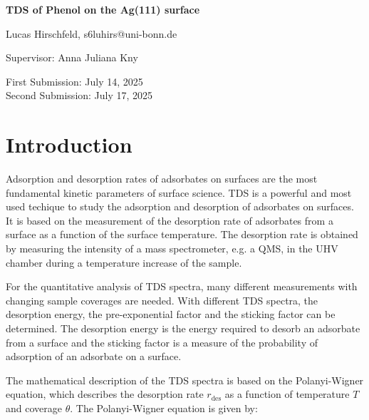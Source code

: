 \documentclass[fontsize=11pt,reqno,a4paper,oneside]{scrartcl}
\makeatletter
\def\Autor{Lucas Hirschfeld, s6luhirs@uni-bonn.de}
\def\Titel{\Acf{TDS} of Phenol on the Ag(111) surface}
\def\Date{First Submission: July 14, 2025 \\Second Submission: July 17, 2025}
\def\PiC{Supervisor: Anna Juliana Kny}
\def\Abstract{}
\makeatother
\begin{document}
\pagestyle{empty}
\begin{titlepage}
    \begin{center}
        \vspace*{\fill}
        {\LARGE\bfseries \Titel}\par\vspace{2cm}
        {\Autor\par\vspace{0.5cm}\PiC\par\vspace{1cm}\par\vspace{0.2cm}\Date\par\vspace{5cm}}
    \end{center}
    {\Abstract\vspace{0.5cm}\par}\vfill
\end{titlepage}

\pagestyle{scrheadings}
\tableofcontents
{}
\clearpage

\section{Introduction}

Adsorption and desorption rates of adsorbates on surfaces are the most fundamental kinetic parameters of surface science. \Acf{TDS} is a powerful and most used techique to study the adsorption and desorption of adsorbates on surfaces.\autocite{Yates2015} It is based on the measurement of the desorption rate of adsorbates from a surface as a function of the surface temperature. The desorption rate is obtained by measuring the intensity of a mass spectrometer, e.g. a \ac{QMS}, in the \ac{UHV} chamber during a temperature increase of the sample.\autocite{Kolasinski2012}

For the quantitative analysis of \ac{TDS} spectra, many different measurements with changing sample coverages are needed. With different \ac{TDS} spectra, the desorption energy, the pre-exponential factor and the sticking factor can be determined. The desorption energy is the energy required to desorb an adsorbate from a surface and the sticking factor is a measure of the probability of adsorption of an adsorbate on a surface.

The mathematical description of the \ac{TDS} spectra is based on the Polanyi-Wigner equation\autocite{Kolasinski2012}, which describes the desorption rate $r_\mathrm{des}$ as a function of temperature $T$ and coverage $\theta$. The Polanyi-Wigner equation is given by:
\end{document}
